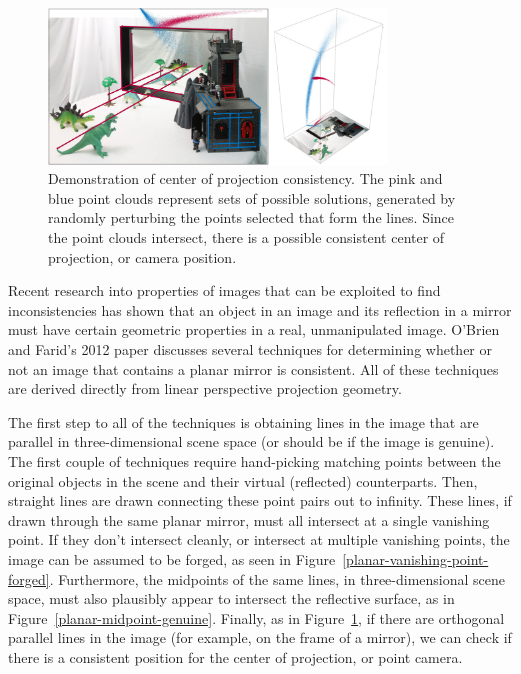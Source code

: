 \documentclass{article}
\begin{document}
\begin{figure}
	\centering
    	\includegraphics[width=0.8\textwidth]{center-of-projection-planar-genuine}
	\caption{Demonstration of center of projection consistency. The pink and blue point clouds represent sets of possible solutions, generated by randomly perturbing the points selected that form the lines. Since the point clouds intersect, there is a possible consistent center of projection, or camera position. \cite{obrien12}}
	\label{center-of-projection-planar-genuine}
\end{figure}

Recent research into properties of images that can be exploited to find inconsistencies has shown that an object in an image and its reflection in a mirror must have certain geometric properties in a real, unmanipulated image. O'Brien and Farid's 2012 paper discusses several techniques for determining whether or not an image that contains a planar mirror is consistent.\nocite{obrien12} All of these techniques are derived directly from linear perspective projection geometry.

The first step to all of the techniques is obtaining lines in the image that are parallel in three-dimensional scene space (or should be if the image is genuine). The first couple of techniques require hand-picking matching points between the original objects in the scene and their virtual (reflected) counterparts. Then, straight lines are drawn connecting these point pairs out to infinity. These lines, if drawn through the same planar mirror, must all intersect at a single vanishing point. If they don't intersect cleanly, or intersect at multiple vanishing points, the image can be assumed to be forged, as seen in Figure~\ref{planar-vanishing-point-forged}. Furthermore, the midpoints of the same lines, in three-dimensional scene space, must also plausibly appear to intersect the reflective surface, as in Figure~\ref{planar-midpoint-genuine}. Finally, as in Figure~\ref{center-of-projection-planar-genuine}, if there are orthogonal parallel lines in the image (for example, on the frame of a mirror), we can check if there is a consistent position for the center of projection, or point camera.
\end{document}
